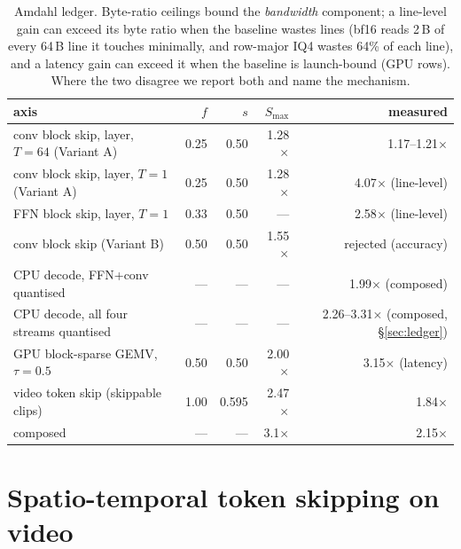 \documentclass[11pt]{article}
\begin{document}
\begin{table}[h]\centering\small
\begin{tabular}{lrrrr}
\toprule
axis & $f$ & $s$ & $S_{\max}$ & measured \\
\midrule
conv block skip, layer, $T{=}64$ (Variant A) & 0.25 & 0.50 & 1.28$\times$ & 1.17--1.21$\times$ \\
conv block skip, layer, $T{=}1$ (Variant A) & 0.25 & 0.50 & 1.28$\times$ & 4.07$\times$ (line-level) \\
FFN block skip, layer, $T{=}1$ & 0.33 & 0.50 & --- & 2.58$\times$ (line-level) \\
conv block skip (Variant B) & 0.50 & 0.50 & 1.55$\times$ & rejected (accuracy) \\
CPU decode, FFN+conv quantised & --- & --- & --- & 1.99$\times$ (composed) \\
CPU decode, all four streams quantised & --- & --- & --- & 2.26--3.31$\times$ (composed, \S\ref{sec:ledger}) \\
GPU block-sparse GEMV, $\tau{=}0.5$ & 0.50 & 0.50 & 2.00$\times$ & 3.15$\times$ (latency) \\
video token skip (skippable clips) & 1.00 & 0.595 & 2.47$\times$ & 1.84$\times$ \\
composed & --- & --- & 3.1$\times$ & 2.15$\times$ \\
\bottomrule
\end{tabular}
\caption{Amdahl ledger. Byte-ratio ceilings bound the \emph{bandwidth} component; a
line-level gain can exceed its byte ratio when the baseline wastes lines (bf16 reads 2\,B
of every 64\,B line it touches minimally, and row-major IQ4 wastes 64\% of each line), and a
latency gain can exceed it when the baseline is launch-bound (GPU rows). Where the two
disagree we report both and name the mechanism.}
\end{table}


\section{Spatio-temporal token skipping on video}
\end{document}
